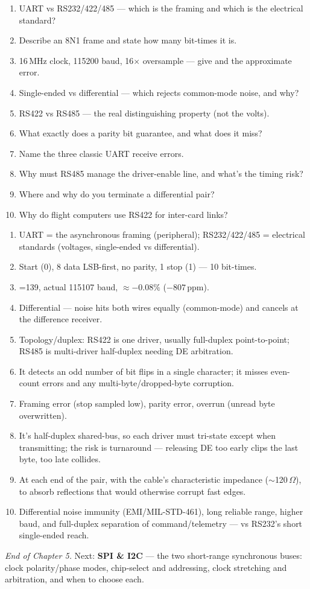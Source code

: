\begin{scorecard}
\begin{enumerate}
\item UART vs RS232/422/485 --- which is the framing and which is the
  electrical standard?
\item Describe an 8N1 frame and state how many bit-times it is.
\item 16\,MHz clock, 115200 baud, 16$\times$ oversample --- give  and
  the approximate error.
\item Single-ended vs differential --- which rejects common-mode noise, and
  why?
\item RS422 vs RS485 --- the real distinguishing property (not the volts).
\item What exactly does a parity bit guarantee, and what does it miss?
\item Name the three classic UART receive errors.
\item Why must RS485 manage the driver-enable line, and what's the timing risk?
\item Where and why do you terminate a differential pair?
\item Why do flight computers use RS422 for inter-card links?
\end{enumerate}
\end{scorecard}

\begin{answerkey}
\begin{enumerate}
\item UART = the asynchronous framing (peripheral); RS232/422/485 = electrical
  standards (voltages, single-ended vs differential).
\item Start (0), 8 data LSB-first, no parity, 1 stop (1) --- 10 bit-times.
\item {}=139, actual 115107 baud, $\approx-0.08\%$ ($-807$\,ppm).
\item Differential --- noise hits both wires equally (common-mode) and cancels
  at the difference receiver.
\item Topology/duplex: RS422 is one driver, usually full-duplex point-to-point;
  RS485 is multi-driver half-duplex needing DE arbitration.
\item It detects an odd number of bit flips in a single character; it misses
  even-count errors and any multi-byte/dropped-byte corruption.
\item Framing error (stop sampled low), parity error, overrun (unread byte
  overwritten).
\item It's half-duplex shared-bus, so each driver must tri-state except when
  transmitting; the risk is turnaround --- releasing DE too early clips the last
  byte, too late collides.
\item At each end of the pair, with the cable's characteristic impedance
  ($\sim$120\,$\Omega$), to absorb reflections that would otherwise corrupt fast
  edges.
\item Differential noise immunity (EMI/MIL-STD-461), long reliable range,
  higher baud, and full-duplex separation of command/telemetry --- vs RS232's
  short single-ended reach.
\end{enumerate}
\end{answerkey}

\begin{partnote}
\emph{End of Chapter 5.} Next: \textbf{SPI \& I2C} --- the two short-range
synchronous buses: clock polarity/phase modes, chip-select and addressing,
clock stretching and arbitration, and when to choose each.
\end{partnote}
